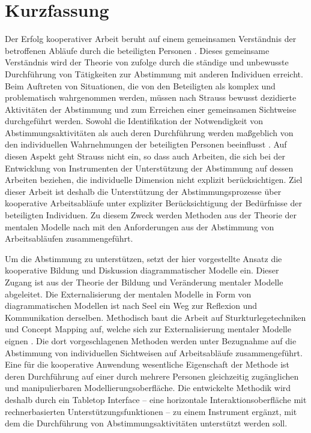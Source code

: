 
\section*{Kurzfassung}
Der Erfolg kooperativer Arbeit beruht auf einem gemeinsamen Verständnis der betroffenen Abläufe durch die beteiligten Personen \citep{Griffin92}. Dieses gemeinsame Verständnis wird der Theorie von \citet{Strauss85} zufolge durch die ständige und unbewusste Durchführung von Tätigkeiten zur Abstimmung mit anderen Individuen erreicht. Beim Auftreten von Situationen, die von den Beteiligten als komplex und problematisch wahrgenommen werden, müssen nach Strauss bewusst dezidierte Aktivitäten der Abstimmung und zum Erreichen einer gemeinsamen Sichtweise durchgeführt werden. Sowohl die Identifikation der Notwendigkeit von Abstimmungsaktivitäten als auch deren Durchführung werden maßgeblich von den individuellen Wahrnehmungen der beteiligten Personen beeinflusst \citep{Grudin88}. Auf diesen Aspekt geht Strauss nicht ein, so dass auch Arbeiten, die sich bei der Entwicklung von Instrumenten der Unterstützung der Abstimmung auf dessen Arbeiten beziehen, die individuelle Dimension nicht explizit berücksichtigen. Ziel dieser Arbeit ist deshalb die Unterstützung der Abstimmungsprozesse über kooperative Arbeitsabläufe unter expliziter Berücksichtigung der Bedürfnisse der beteiligten Individuen. Zu diesem Zweck werden Methoden aus der Theorie der mentalen Modelle nach \citet{Johnson-Laird81} mit den Anforderungen aus der Abstimmung von Arbeitsabläufen zusammengeführt.

Um die Abstimmung zu unterstützen, setzt der hier vorgestellte Ansatz die kooperative Bildung und Diskussion diagrammatischer Modelle ein. Dieser Zugang ist aus der Theorie der Bildung und Veränderung mentaler Modelle \citep{Seel91} abgeleitet. Die Externalisierung der mentalen Modelle in Form von diagrammatischen Modellen ist nach Seel ein Weg zur Reflexion und Kommunikation derselben. Methodisch baut die Arbeit auf Sturkturlegetechniken und Concept Mapping auf, welche sich zur Externalisierung mentaler Modelle eignen \citep{Ifenthaler06}. Die dort vorgeschlagenen Methoden werden unter Bezugnahme auf die Abstimmung von individuellen Sichtweisen auf Arbeitsabläufe zusammengeführt. Eine für die kooperative Anwendung wesentliche Eigenschaft der Methode ist deren Durchführung auf einer durch mehrere Personen gleichzeitig zugänglichen und manipulierbaren Modellierungsoberfläche. Die entwickelte Methodik wird deshalb durch ein Tabletop Interface -- eine horizontale Interaktionsoberfläche mit rechnerbasierten Unterstützungsfunktionen -- zu einem Instrument ergänzt, mit dem die Durchführung von Abstimmungsaktivitäten unterstützt werden soll. 

